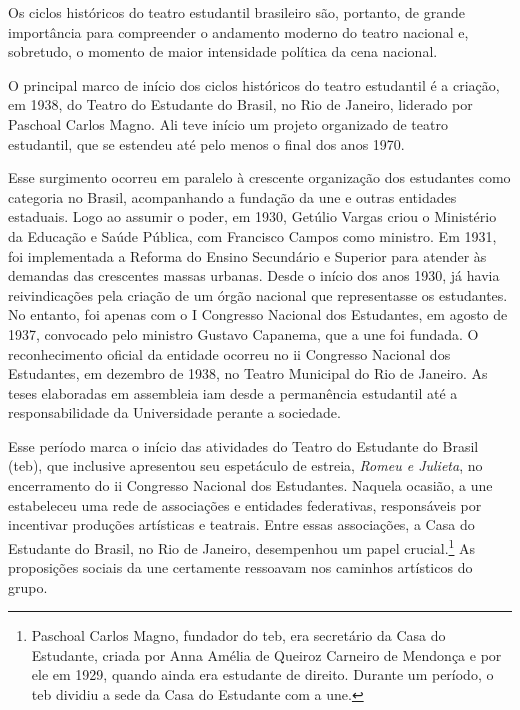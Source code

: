 Os ciclos históricos do teatro estudantil brasileiro são, portanto, de
grande importância para compreender o andamento moderno do teatro
nacional e, sobretudo, o momento de maior intensidade política da cena
nacional.

\subject{Pedra angular: Teatro do Estudante do Brasil}

O principal marco de início dos ciclos históricos do teatro estudantil é
a criação, em 1938, do Teatro do Estudante do Brasil, no Rio de Janeiro,
liderado por Paschoal Carlos Magno. Ali teve início um projeto
organizado de teatro estudantil, que se estendeu até pelo menos o final
dos anos 1970.

Esse surgimento ocorreu em paralelo à crescente organização dos
estudantes como categoria no Brasil, acompanhando a fundação da {\sc une} e
outras entidades estaduais. Logo ao assumir o poder, em 1930, Getúlio
Vargas criou o Ministério da Educação e Saúde Pública, com Francisco
Campos como ministro. Em 1931, foi implementada a Reforma do Ensino
Secundário e Superior para atender às demandas das crescentes massas
urbanas. Desde o início dos anos 1930, já havia reivindicações pela
criação de um órgão nacional que representasse os estudantes. No
entanto, foi apenas com o I Congresso Nacional dos Estudantes, em agosto
de 1937, convocado pelo ministro Gustavo Capanema, que a {\sc une} foi
fundada. O reconhecimento oficial da entidade ocorreu no {\sc ii} Congresso
Nacional dos Estudantes, em dezembro de 1938, no Teatro Municipal do Rio
de Janeiro. As teses elaboradas em assembleia iam desde a permanência
estudantil até a responsabilidade da Universidade perante a sociedade.

Esse período marca o início das atividades do Teatro do Estudante do
Brasil ({\sc teb}), que inclusive apresentou seu espetáculo de estreia,
{\it Romeu e Julieta}, no encerramento do {\sc ii} Congresso Nacional dos
Estudantes. Naquela ocasião, a {\sc une} estabeleceu uma rede de associações e
entidades federativas, responsáveis por incentivar produções artísticas
e teatrais. Entre essas associações, a Casa do Estudante do Brasil, no
Rio de Janeiro, desempenhou um papel crucial.\footnote{Paschoal Carlos
  Magno, fundador do {\sc teb}, era secretário da Casa do Estudante, criada
  por Anna Amélia de Queiroz Carneiro de Mendonça e por ele em 1929,
  quando ainda era estudante de direito. Durante um período, o {\sc teb}
  dividiu a sede da Casa do Estudante com a {\sc une}.} As proposições sociais
da {\sc une} certamente ressoavam nos caminhos artísticos do grupo.

